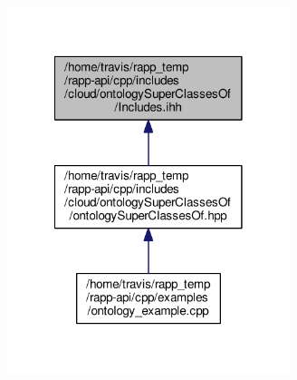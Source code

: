 \begin{figure}[H]
\begin{center}
\leavevmode
\includegraphics[width=234pt]{cloud_2ontologySuperClassesOf_2Includes_8ihh__dep__incl}
\end{center}
\end{figure}
